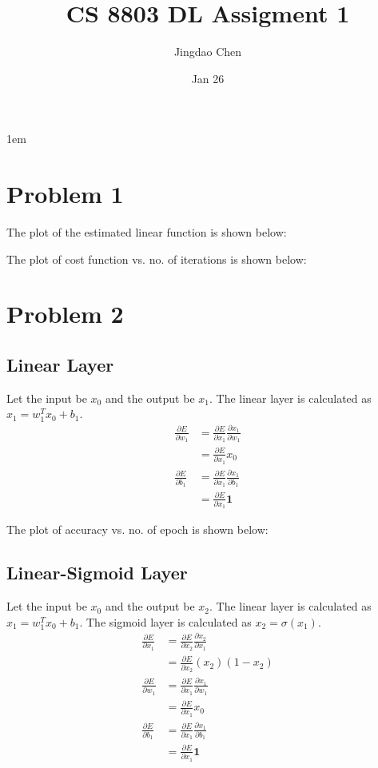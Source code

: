\documentclass[twoside,12pt]{article}
\begin{document}
\title{CS 8803 DL Assigment 1}
\author{Jingdao Chen}
\date{Jan 26}
\maketitle
\openup 1em

\section{Problem 1}

The plot of the estimated linear function is shown below:

The plot of cost function vs. no. of iterations is shown below:

\section{Problem 2}

\subsection{Linear Layer}

Let the input be $x_0$ and the output be $x_1$. The linear layer is calculated as $x_1=w_1^Tx_0+b_1$.
\begin{equation}
\begin{split}
\frac{\partial E}{\partial w_1} &= \frac{\partial E}{\partial x_1} \frac{\partial x_1}{\partial w_1} \\
							    &= \frac{\partial E}{\partial x_1} x_0 \\
\frac{\partial E}{\partial b_1} &= \frac{\partial E}{\partial x_1} \frac{\partial x_1}{\partial b_1} \\
							    &= \frac{\partial E}{\partial x_1} \mathbf{1} 
\end{split}
\end{equation}

The plot of accuracy vs. no. of epoch is shown below:

\subsection{Linear-Sigmoid Layer}

Let the input be $x_0$ and the output be $x_2$. The linear layer is calculated as $x_1=w_1^Tx_0+b_1$.
The sigmoid layer is calculated as $x_2=\sigma(x_1)$.
\begin{equation}
\begin{split}
\frac{\partial E}{\partial x_1} &= \frac{\partial E}{\partial x_2} \frac{\partial x_2}{\partial x_1} \\
							    &= \frac{\partial E}{\partial x_2} (x_2) (1-x_2) \\
\frac{\partial E}{\partial w_1} &= \frac{\partial E}{\partial x_1} \frac{\partial x_1}{\partial w_1} \\
							    &= \frac{\partial E}{\partial x_1} x_0 \\
\frac{\partial E}{\partial b_1} &= \frac{\partial E}{\partial x_1} \frac{\partial x_1}{\partial b_1} \\
							    &= \frac{\partial E}{\partial x_1} \mathbf{1} 
\end{split}
\end{equation}
\end{document}
